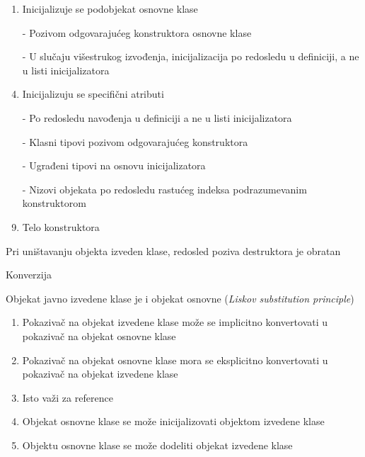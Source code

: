 \documentclass{article}
\newenvironment{xitemize}{%
    
    \itemize
    \larger
}{%
    \enditemize
}
\let\olditemize\itemize
\let\endolditemize\enditemize
\renewenvironment{itemize}{%
    \smaller
    \olditemize
}{%
    \endolditemize
}
\begin{document}
\begin{xitemize}
\begin{itemize}
    \begin{enumerate}
        \item Inicijalizuje se podobjekat osnovne klase
        \begin{itemize}
            \item[-] Pozivom odgovarajućeg konstruktora osnovne klase
            \item[-] U slučaju višestrukog izvođenja, inicijalizacija po redosledu u definiciji, a ne u listi inicijalizatora
        \end{itemize}
        \item Inicijalizuju se specifični atributi
        \begin{itemize}
            \item[-] Po redosledu navođenja u definiciji a ne u listi inicijalizatora
            \item[-] Klasni tipovi pozivom odgovarajućeg konstruktora
            \item[-] Ugrađeni tipovi na osnovu inicijalizatora
            \item[-] Nizovi objekata po redosledu rastućeg indeksa podrazumevanim konstruktorom
        \end{itemize}
        \item Telo konstruktora
    \end{enumerate}
    \item Pri uništavanju objekta izveden klase, redosled poziva destruktora je obratan
\end{itemize}
\item Konverzija
\begin{itemize}
    \item Objekat javno izvedene klase je i objekat osnovne (\textit{Liskov substitution principle})
\end{itemize}
\begin{enumerate}
    \item Pokazivač na objekat izvedene klase može se implicitno konvertovati u pokazivač na objekat osnovne klase
    \item Pokazivač na objekat osnovne klase mora se eksplicitno konvertovati u pokazivač na objekat izvedene klase
    \item Isto važi za reference
    \item Objekat osnovne klase se može inicijalizovati objektom izvedene klase
    \item Objektu osnovne klase se može dodeliti objekat izvedene klase
\end{enumerate}

\end{xitemize}
\end{document}
